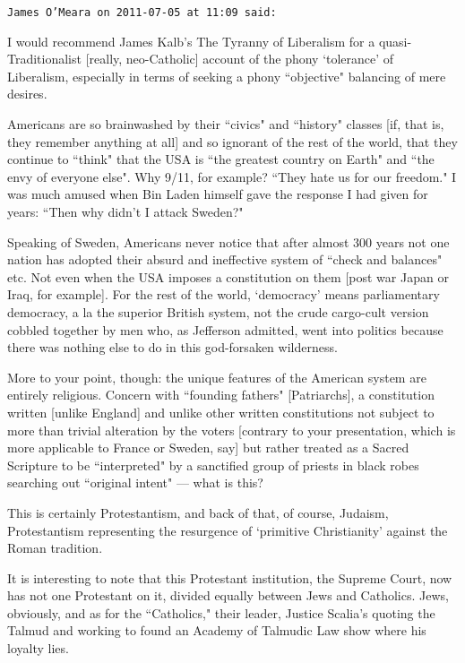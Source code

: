 \begin{footnotesize}\begin{sffamily}



\texttt{James O'Meara on 2011-07-05 at 11:09 said: }

I would recommend James Kalb's The Tyranny of Liberalism for a quasi-Traditionalist [really, neo-Catholic] account of the phony `tolerance' of Liberalism, especially in terms of seeking a phony ``objective" balancing of mere desires.

Americans are so brainwashed by their ``civics" and ``history" classes [if, that is, they remember anything at all] and so ignorant of the rest of the world, that they continue to ``think" that the USA is ``the greatest country on Earth" and ``the envy of everyone else". Why 9/11, for example? ``They hate us for our freedom." I was much amused when Bin Laden himself gave the response I had given for years: ``Then why didn't I attack Sweden?"

Speaking of Sweden, Americans never notice that after almost 300 years not one nation has adopted their absurd and ineffective system of ``check and balances" etc. Not even when the USA imposes a constitution on them [post war Japan or Iraq, for example]. For the rest of the world, `democracy' means parliamentary democracy, a la the superior British system, not the crude cargo-cult version cobbled together by men who, as Jefferson admitted, went into politics because there was nothing else to do in this god-forsaken wilderness.

More to your point, though: the unique features of the American system are entirely religious. Concern with ``founding fathers" [Patriarchs], a constitution written [unlike England] and unlike other written constitutions not subject to more than trivial alteration by the voters [contrary to your presentation, which is more applicable to France or Sweden, say] but rather treated as a Sacred Scripture to be ``interpreted" by a sanctified group of priests in black robes searching out ``original intent" — what is this?

This is certainly Protestantism, and back of that, of course, Judaism, Protestantism representing the resurgence of `primitive Christianity' against the Roman tradition.

It is interesting to note that this Protestant institution, the Supreme Court, now has not one Protestant on it, divided equally between Jews and Catholics. Jews, obviously, and as for the ``Catholics," their leader, Justice Scalia's quoting the Talmud and working to found an Academy of Talmudic Law show where his loyalty lies.


\end{sffamily}
\end{footnotesize}
